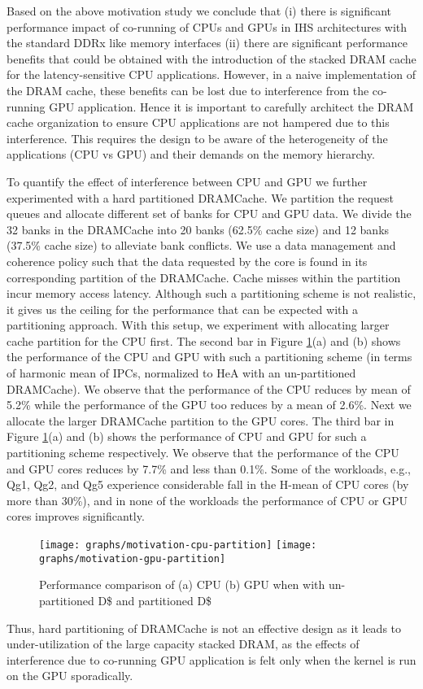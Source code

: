 \par Based on the above motivation study we conclude that (i) there is significant performance impact of co-running of CPUs and GPUs in IHS architectures with the standard DDRx like memory interfaces (ii) there are significant performance benefits that could be obtained 
with the introduction of the stacked DRAM cache for the latency-sensitive CPU applications. However, in a naive implementation
of the DRAM cache, these benefits can be lost due to interference from the co-running GPU application.  Hence it is important to carefully architect the DRAM cache organization to ensure CPU applications are not hampered due to this interference.
This requires the design to be aware of the heterogeneity of the applications (CPU vs GPU) and their demands on the 
memory hierarchy.  


\par To quantify the effect of interference between CPU and GPU we further experimented with a hard partitioned DRAMCache. We partition the request queues and allocate different set of banks for CPU and GPU data. We divide the 32 banks in the DRAMCache into 20 banks (62.5\% cache size) and 12 banks (37.5\% cache size) to alleviate bank conflicts. We use a data management and coherence policy such that the data requested by the core is found in its corresponding partition of the DRAMCache. Cache misses within the partition incur memory access latency. Although such a partitioning scheme is not realistic, it gives us the ceiling for the performance that can be expected with a partitioning approach. With this setup, we experiment with allocating larger cache partition for the CPU first. The second bar in Figure \ref{fig:motivation-partition}(a) and (b) shows the performance of the CPU and GPU with such a partitioning scheme (in terms of harmonic mean of IPCs, normalized to HeA with an un-partitioned DRAMCache). We observe that the performance of the CPU reduces by mean of 5.2\% while the performance of the GPU too reduces by a mean of 2.6\%.
Next we allocate the larger DRAMCache partition to the GPU cores. The third bar in Figure \ref{fig:motivation-partition}(a) and (b) shows the performance of CPU and GPU for such a partitioning scheme respectively. We observe that the performance of the CPU and GPU cores reduces by 7.7\% and less than 0.1\%. Some of the workloads, e.g., Qg1, Qg2, and Qg5 experience considerable fall in the H-mean of CPU cores (by more than 30\%), and in none of the workloads the performance of CPU or GPU cores improves significantly.
\begin{figure}[htbp]
	\centering
	\texttt{[image: graphs/motivation-cpu-partition]}
	\texttt{[image: graphs/motivation-gpu-partition]}
	\caption{Performance comparison of (a) CPU (b) GPU when with un-partitioned D\$ and partitioned D\$}
	\label{fig:motivation-partition}
\end{figure}
Thus, hard partitioning of DRAMCache is not an effective design as it leads to under-utilization of the large capacity 
stacked DRAM, as the effects of interference due to co-running GPU application is felt only when the kernel is run on the GPU sporadically.

